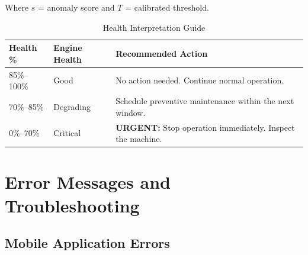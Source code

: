\documentclass[10pt, a4paper, oneside]{report}
\begin{document}
Where $s$ = anomaly score and $T$ = calibrated threshold.

\begin{table}[H]
\centering
\caption{Health Interpretation Guide}
\label{tab:health-guide}
\begin{tabularx}{\textwidth}{l l X}
  \toprule
  \textbf{Health \%} & \textbf{Engine Health} & \textbf{Recommended Action} \\
  \midrule
  85\%--100\% & Good      & No action needed. Continue normal operation. \\
  70\%--85\%  & Degrading & Schedule preventive maintenance within the next window. \\
  0\%--70\%   & Critical  & \textbf{URGENT:} Stop operation immediately. Inspect the machine. \\
  \bottomrule
\end{tabularx}
\end{table}


\chapter{Error Messages and Troubleshooting}
\label{ch:troubleshooting}

\section{Mobile Application Errors}
\end{document}
